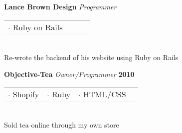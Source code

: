 \documentclass[margin,line]{res}
\begin{document}
{\begin{resume}
    {\bf Lance Brown Design} {\em Programmer} \hfill %
    \\
    \begin{tabular}{l l l l}
      $\cdot$ Ruby on Rails
    \end{tabular}
    \\
    \hspace*{.14pt} 
    Re-wrote the backend of his website using Ruby on Rails 
    \vspace{-.13in}

    {\bf Objective-Tea} {\em Owner/Programmer} \hfill {\bf 2010}
    \\
    \begin{tabular}{l l l l}
      $\cdot$ Shopify & $\cdot$ Ruby & $\cdot$ HTML/CSS
    \end{tabular}
    \\
    \hspace*{.14pt} 
    Sold tea online through my own store


    {\color{WildStrawberry}
      \vspace{-.13in}
}
\end{resume}}
\end{document}
